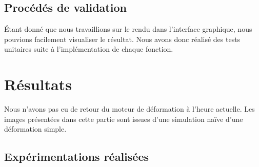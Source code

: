 \documentclass[a4paper, 11pt]{article}
\begin{document}
\subsection{Procédés de validation}
Étant donné que nous travaillions sur le rendu dans l'interface graphique, nous pouvions facilement visualiser le résultat.
Nous avons donc réalisé des tests unitaires suite à l'implémentation de chaque fonction.

\section{Résultats}
Nous n'avons pas eu de retour du moteur de déformation à l'heure actuelle.
Les images présentées dans cette partie sont issues d'une simulation naïve d'une déformation simple.

\subsection{Expérimentations réalisées}
\end{document}
